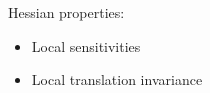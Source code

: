 \documentclass[10pt,final,xcolor=dvipsnames]{beamer}
\begin{document}
\begin{frame}
{\begin{center}
	\end{center}
}

\begin{flushleft}Hessian properties:\end{flushleft}
\begin{itemize}
\item Local sensitivities
\item Local translation invariance
\end{itemize}
\end{frame}
\end{document}
